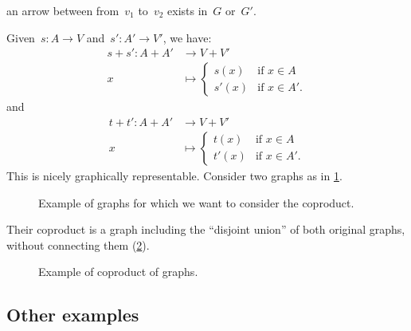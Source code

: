 \begin{example}
\begin{compactitem}
\item an arrow between from~$v_1$ to~$v_2$ exists in~$G$ or~$G'$.
\end{compactitem}
Given~$s\colon A\to V$ and~$s'\colon A'\to V'$, we have:
\begin{equation*}
        \begin{aligned}
            s+ s'\colon A+ A'&\to V+ V'\\
            x&\mapsto
                \begin{cases}
                   s(x)& \text{if } x\in A\\
                    s'(x)&\text{if } x\in A'.
                    \end{cases}
        \end{aligned}
        \end{equation*}
and
\begin{equation*}
        \begin{aligned}
            t+t'\colon A+ A'&\to V+ V'\\
            x&\mapsto
                \begin{cases}
                   t(x)& \text{if } x\in A\\
                    t'(x)&\text{if } x\in A'.
                    \end{cases}
        \end{aligned}
\end{equation*}
This is nicely graphically representable. Consider two graphs as in \cref{fig:graphs_1}.

\begin{figure}[h!]
    \centering
    \caption{Example of graphs for which we want to consider the coproduct. \label{fig:graphs_1}}
\end{figure}

Their coproduct is a graph including the ``disjoint union'' of both original graphs, without connecting them (\cref{fig:graphs_2}).



\begin{figure}[h!]
    \centering
    \caption{Example of coproduct of graphs. \label{fig:graphs_2}}
\end{figure}

\end{example}


\subsection{Other examples}
